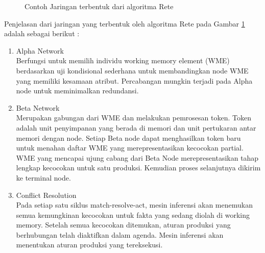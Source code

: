 \begin{figure}[h]	
	{\par}
	\caption{Contoh Jaringan terbentuk  dari algoritma Rete}
	\label{fig:rete}
\end{figure}

Penjelasan dari jaringan yang terbentuk oleh algoritma Rete pada Gambar \ref{fig:rete} adalah sebagai berikut :
\begin{enumerate}
	\item Alpha Network\\
	Berfungsi untuk memilih individu working memory element (WME) berdasarkan uji kondisional sederhana untuk membandingkan node WME yang memiliki kesamaan atribut. Percabangan mungkin terjadi pada Alpha node untuk meminimalkan redundansi.
	\item Beta Network\\
	Merupakan gabungan dari WME dan melakukan pemrosesan token. Token adalah unit penyimpanan yang berada di memori dan unit pertukaran antar memori dengan node. Setiap Beta node dapat menghasilkan token baru untuk menahan daftar WME yang merepresentasikan kecocokan partial. WME yang mencapai ujung cabang dari Beta Node merepresentasikan tahap lengkap kecocokan untuk satu produksi. Kemudian proses selanjutnya dikirim ke terminal node.
	\item Conflict Resolution\\
	Pada setiap satu siklus match-resolve-act, mesin inferensi akan menemukan semua kemungkinan kecocokan untuk fakta yang sedang diolah di working memory. Setelah semua kecocokan ditemukan, aturan produksi yang berhubungan telah diaktifkan dalam agenda. Mesin inferensi akan menentukan aturan produksi yang tereksekusi.  
\end{enumerate}
